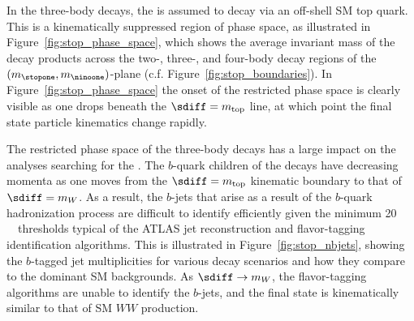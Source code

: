In the three-body decays, the \stopone is assumed to decay via an off-shell SM top quark.
This is a kinematically suppressed region of phase space, as illustrated in Figure~\ref{fig:stop_phase_space},
which shows the average invariant mass of the \stopone decay products across the
two-, three-, and four-body decay regions of the $(m_{\stopone}, m_{\ninoone})$-plane (c.f. Figure~\ref{fig:stop_boundaries}).
In Figure~\ref{fig:stop_phase_space} the onset of the restricted phase space is clearly
visible as one drops beneath the $\sdiff = m_{\text{top}}$ line, at which point the final
state particle kinematics change rapidly.

The restricted phase space of the three-body \stopone decays has a large
impact on the analyses searching for the \stopone.
The $b$-quark children of the \stopone decays have decreasing momenta as one
moves from the $\sdiff = m_{\text{top}}$ kinematic boundary to that of $\sdiff = m_{W}$.
As a result, the $b$-jets that arise as a result of the $b$-quark hadronization process
are difficult to identify efficiently given the minimum 20\,\GeV~\pT~thresholds typical
of the ATLAS jet reconstruction and flavor-tagging identification algorithms.
This is illustrated in Figure~\ref{fig:stop_nbjets}, showing the $b$-tagged jet multiplicities
for various \stopone decay scenarios and how they compare to the dominant SM backgrounds.
As $\sdiff \rightarrow m_W$, the flavor-tagging algorithms are unable to identify the $b$-jets,
and the final state is kinematically similar to that of SM $WW$ production.

